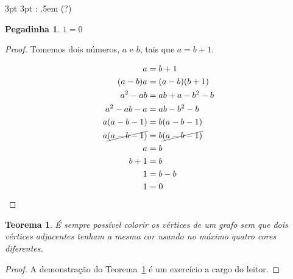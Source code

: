 {3pt} %
{3pt} %
{\itshape} %
{} %
{\bfseries} %
{:} %
{.5em} %
{\space(?)} %

\theoremstyle{smile} %
\newtheorem{absurd}{Pegadinha}

\begin{absurd}\label{thm:doisum}
  $1=0$
\end{absurd}

\begin{proof}
Tomemos dois números, $a$ e $b$, tais que $a=b+1$.

\begin{displaymath}
  \begin{split}
    a &= b+1 \\
    (a-b)a &= (a-b)(b+1) \\
    a^2 - ab &= ab + a -b^2 -b \\
    a^2 -ab -a &= ab -b^2 -b \\
    a(a-b-1) &= b(a-b-1) \\
    a \cancel{(a-b-1)} &= b \cancel{(a-b-1)} \\
    a &= b \\
    b+1 &= b \\
    1 &= b-b \\
    1 &= 0
  \end{split}
\end{displaymath}
\end{proof}

\theoremstyle{plain} %
\newtheorem{theorem}{Teorema}

\begin{theorem}
  \label{thm:graphcolor}
  É sempre possível colorir os vértices de um grafo sem que dois vértices
  adjacentes tenham a mesma cor usando no máximo quatro cores diferentes.
\end{theorem}

\begin{proof}
  A demonstração do Teorema~\ref{thm:graphcolor} é um exercício
  a cargo do leitor.
  \renewcommand\qedsymbol{} %
\end{proof}

